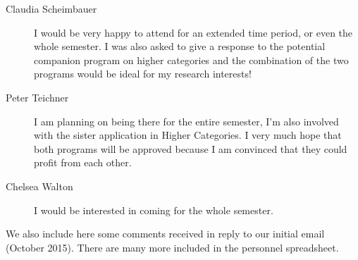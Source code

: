 \documentclass[12pt]{article}
\begin{document}
\begin{description}
\item[Claudia Scheimbauer] I would be very happy to attend for an extended time period, or even the whole semester. I was also asked to give a response to the potential companion program on higher categories and the combination of the two programs would be ideal for my research interests!
\item[Peter Teichner] I am planning on being there for the entire semester, I’m also involved with the sister application in Higher Categories. I very much hope that both programs will be approved because I am convinced that they could profit from each other.
\item[Chelsea Walton] I would be interested in coming for the whole semester.
\end{description}

We also include here some comments received in reply to our initial email (October 2015). There are many more included in the personnel spreadsheet.
\end{document}
